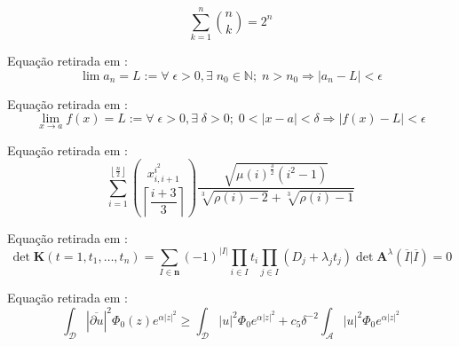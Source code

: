 \begin{prob}
\label{prob5}
\begin{equation*}
    \sum\limits_{k=1}^{n}\binom{n}{k} = 2^{n}
\end{equation*}
\end{prob}

\begin{prob}
\label{prob6}
Equação retirada em \cite{Elon}:
\begin{equation*}
    \lim a_{n} = L := \forall\;\epsilon > 0,\exists\;n_{0}\in\mathbb{N};\;n>n_{0}\Rightarrow|a_{n}-L|<\epsilon
\end{equation*}
\end{prob}

\begin{prob}
\label{prob7}
Equação retirada em \cite{Elon}:
\begin{equation*}
    \lim\limits_{x\to a} f(x) = L := \forall\;\epsilon > 0,\exists\;\delta>0;\;0<|x-a|<\delta\Rightarrow|f(x)-L|<\epsilon
\end{equation*}
\end{prob}

\begin{prob}
\label{prob8}
Equação retirada em \cite{gratzer2007more}:
\begin{equation*}
    \sum\limits_{i=1}^{\left\lfloor \frac{n}{2} \right\rfloor} \binom{x_{i,i+1}^{i^{2}}}{\left\lceil \dfrac{i+3}{3} \right\rceil}\frac{\sqrt{\mu (i)^{\frac{3}{2}}(i^{2}-1)}}{\sqrt[3]{\rho (i)-2}+\sqrt[3]{\rho (i)-1}}
\end{equation*}
\end{prob}

\begin{prob}
\label{prob9}
Equação retirada em \cite{gratzer2007more}:
\begin{equation*}
    \det \mathbf{K}(t = 1, t_1,\dots,t_n) = \sum\limits_{I\in\mathbf{n}}(-1)^{|I|}\prod\limits_{i\in I} t_{i}\prod\limits_{j\in I} (D_{j} + \lambda_{j}t_{j}) \det \mathbf{A}^{\lambda}(\overline{I} | \overline{I}) = 0
\end{equation*}
\end{prob}

\begin{prob}
\label{prob10}
Equação retirada em \cite{gratzer2007more}:
\begin{equation*}
    \int_{\mathcal{D}} |\overline{\partial u}|^{2} \Phi_{0}(z) e^{\alpha |z|^{2}} \ge \int_{\mathcal{D}} |u|^2 \Phi_{0}e^{\alpha |z|^{2}} + c_{5}\delta^{-2} \int_{\mathcal{A}} |u|^2 \Phi_{0}e^{\alpha |z|^{2}}
\end{equation*}
\end{prob}

